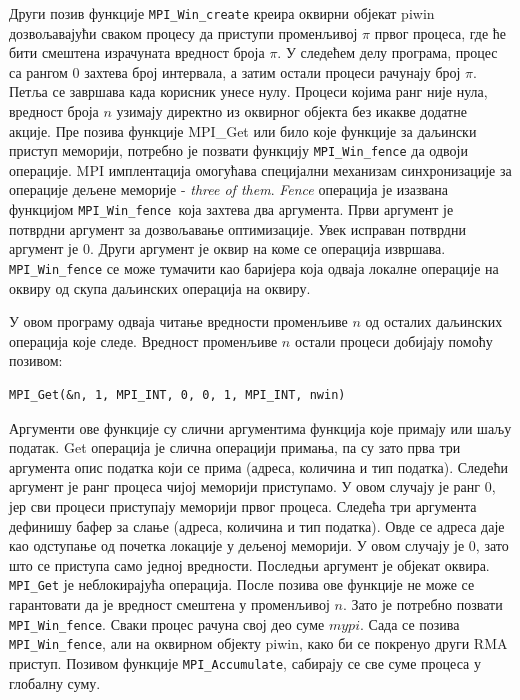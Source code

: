 Други позив функције \texttt{MPI\_Win\_create} креира оквирни објекат piwin дозвољавајући сваком процесу да приступи променљивој $\pi$ првог процеса, где ће бити смештена израчуната вредност броја $\pi$.
У следећем делу програма, процес са рангом 0 захтева број интервала, а затим остали процеси рачунају број $\pi$. Петља се завршава када корисник унесе нулу. Процеси којима ранг није нула, вредност броја $n$ узимају  директно из оквирног објекта без икакве додатне акције. Пре позива функције MPI\_Get или било које функције за даљински приступ меморији, потребно је позвати функцију \texttt{MPI\_Win\_fence} да одвоји операције. MPI имплентација омогућава специјални механизам синхронизације за операције дељене меморије - \textit{three of them}. \textit{Fence} операција је изазвана функцијом \texttt{MPI\_Win\_fence }која захтева два аргумента. Први аргумент је потврдни аргумент за дозвољавање оптимизације. Увек исправан потврдни аргумент је 0. Други аргумент је оквир на коме се операција извршава. \texttt{MPI\_Win\_fence} се може тумачити као баријера која одваја локалне операције на оквиру од скупа даљинских операција на оквиру.

У овом програму одваја читање вредности променљиве $n$ од осталих даљинских операција које следе. Вредност променљиве $n$ остали процеси добијају помоћу позивом:

\begin{verbatim}
MPI_Get(&n, 1, MPI_INT, 0, 0, 1, MPI_INT, nwin)
\end{verbatim}

Аргументи ове функције су слични аргументима функција које примају или шаљу податак. Get операција је слична операцији примања, па су зато прва три аргумента опис податка који се прима (адреса, количина и тип податка).  Следећи аргумент је ранг процеса чијој меморији приступамо. У овом случају је ранг 0, јер сви процеси приступају меморији првог процеса.
Следећа три аргумента дефинишу бафер за слање (адреса, количина и тип податка). Овде се адреса даје као одступање од почетка локације у дељеној меморији. У овом случају је 0, зато што се приступа само једној вредности. Последњи аргумент је објекат оквира.  \texttt{MPI\_Get} је неблокирајућа операција. После позива ове функције не може се гарантовати да је вредност смештена у променљивој $n$. Зато је потребно позвати \texttt{MPI\_Win\_fence}. Сваки процес рачуна свој део суме $mypi$. Сада се позива \texttt{MPI\_Win\_fence}, али на оквирном објекту piwin, како би се покренуо други 
RMA приступ. Позивом функције \texttt{MPI\_Accumulate}, сабирају се све суме процеса у глобалну суму.

